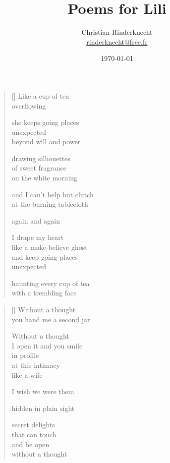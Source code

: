 \documentclass[12pt,a4paper]{article}
\title{Poems for Lili}
\author{Christian Rinderknecht\\
{\small \url{rinderknecht@free.fr}}}
\date{\today}
\begin{document}
\maketitle

\thispagestyle{empty}


\newpage

\poemtitle{}

\settowidth{\versewidth}{Like a make-believe ghost}

\bigskip

\begin{verse}[\versewidth]
  Like a cup of tea \\
  overflowing

  she keeps going places \\
  unexpected \\
  beyond will and power

  drawing silhouettes \\
  of sweet fragrance \\
  on the white morning

  and I can't help but clutch \\
  at the burning tablecloth

  again and again

  I drape my heart \\
  like a make-believe ghost \\
  and keep going places \\
  unexpected

  haunting every cup of tea \\
  with a trembling face
\end{verse}


\newpage

\poemtitle{}

\settowidth{\versewidth}{You hand me a second jar}

\bigskip

\begin{verse}[\versewidth]
  Without a thought \\
  you hand me a second jar

  Without a thought \\
  I open it and you smile \\
  in profile \\
  at this intimacy \\
  like a wife

  I wish we were them

  hidden in plain sight

  secret delights \\
  that can touch \\
  and be open \\
  without a thought
\end{verse}
\end{document}
